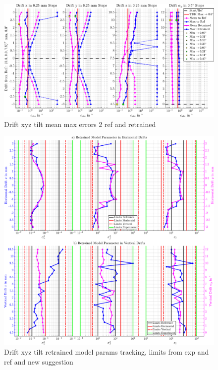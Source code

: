 \begin{figure}[tbph]
	\centering
	\includegraphics[width=\linewidth]{appendix/images/8-Ergebnisse-Experimente/Drift-Model-Errors}
	\caption[Drift xyz tilt mean max errors 2 ref and retrained]{Drift xyz tilt mean max errors 2 ref and retrained}
	\label{fig:drift-model-errors}
\end{figure}


\begin{figure}[tbph]
	\centering
	\includegraphics[width=\linewidth]{appendix/images/8-Ergebnisse-Experimente/Drift-Model-Parms}
	\caption[Drift xyz tilt retrained model params tracking]{Drift xyz tilt retrained model params tracking, limits from exp and ref and new suggestion}
	\label{fig:drift-model-parms}
\end{figure}


